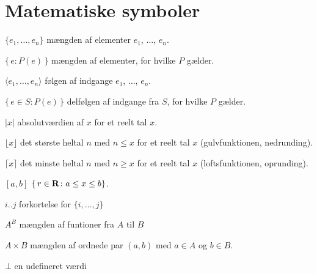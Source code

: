 \newenvironment{mydescription}
{\begin{list}{}{\setlength\labelwidth{0pt}%
               \setlength\itemindent{-\leftmargin}%
               \addtolength{\itemindent}{5pt}
               \setlength\itemsep{8pt plus 1pt}%
               \let\makelabel\mydescriptionlabel}}
{\end{list}}
\newcommand*\mydescriptionlabel[1]{#1}

\newcommand{\lref}[1]{\eqref{#1}}
\section{Matematiske symboler}

\begin{mydescription}
\item[$\{e_1,\ldots,e_n\}$] mængden af elementer $e_1$, $\ldots$, $e_n$.

\item[$\{\,e\colon P(e)\,\}$] mængden af elementer, for hvilke $P$ gælder.

\item[$\langle e_1,\ldots,e_n\rangle $] følgen af indgange $e_1$, $\ldots$, $e_n$.

\item[$\{\,e\in S\colon P(e)\,\}$] delfølgen af indgange fra $S$, for hvilke $P$ gælder.

\item[$|x|$] absolutværdien af $x$ for et reelt tal $x$.

\item[$\lfloor x\rfloor$] det største heltal $n$ med $n\leq x$ for et reelt tal $x$ (gulvfunktionen, nedrunding).

\item[$\lceil x\rceil$] det minste heltal $n$ med $n\geq x$ for et reelt tal $x$ (loftsfunktionen, oprunding).


\item[\mbox{$[a,b]$}] $\{\, r\in \mathbf R\colon a \leq x\leq b\}$.


\item[$i..j$] forkortelse for $\{i, \ldots, j\}$

\item[$A^B$] mængden af funtioner fra $A$ til $B$

\item[$A\times B$] mængden af ordnede par $(a,b)$ med $a\in A$ og $b\in B$.

\item[$\bot$] en udefineret værdi


\end{mydescription}
